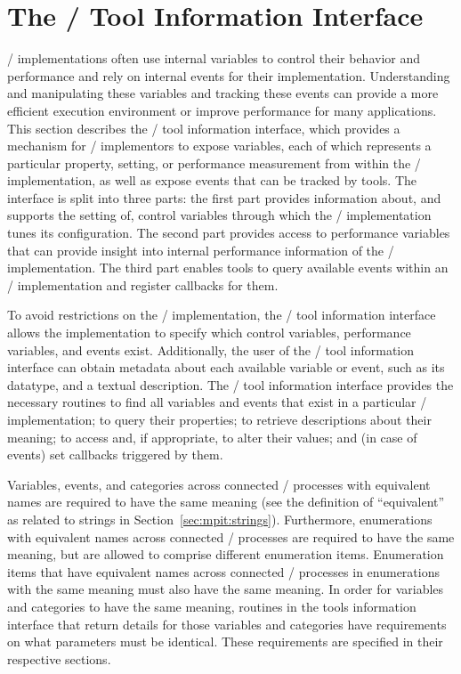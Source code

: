 
\section{The \texorpdfstring{\MPI/}{MPI} Tool Information Interface}
\label{sec:mpit}

\MPI/ implementations often use internal variables to control their
behavior and performance and rely on internal events for their
implementation.  Understanding and manipulating these variables and
tracking these events
can provide a more efficient execution environment or improve performance
for many applications.  This section describes the \MPI/ tool information
interface, which provides a mechanism for \MPI/ implementors to expose
variables, each of which represents a particular property, setting, or
performance measurement from within the \MPI/ implementation, as
well as expose events that can be tracked by tools.  The
interface is split into three parts: the first part provides information
about, and supports the setting of, control variables through which the \MPI/
implementation tunes its configuration.  The second part provides access to
performance variables that can provide insight into internal performance
information of the \MPI/ implementation. The third part enables tools
to query available events within an \MPI/ implementation and
register callbacks for them.

To avoid restrictions on the \MPI/ implementation, the \MPI/ tool
information interface allows the implementation to specify which control variables,
performance variables, and events exist.  Additionally, the user of the \MPI/ tool
information interface can obtain metadata about each available variable or event,
such as its datatype, and a textual description.  The \MPI/ tool
information interface provides the necessary routines to find all variables and events
that exist in a particular \MPI/ implementation; to query their properties;
to retrieve descriptions about their meaning; to access and, if
appropriate, to alter their values; and (in case of events) set callbacks triggered
by them.

Variables, events, and categories across connected \MPI/ processes with equivalent names
are required to have the same meaning (see the definition of ``equivalent''
as related to strings in Section~\ref{sec:mpit:strings}).  Furthermore,
enumerations with equivalent names across connected \MPI/ processes are required
to have the same meaning, but are allowed to comprise different enumeration
items.  Enumeration items that have equivalent names across connected
\MPI/ processes in enumerations with the same meaning must also have the same
meaning.  In order for variables and categories to have the same meaning,
routines in the tools information interface that return details for those
variables and categories have requirements on what parameters must be
identical.  These requirements are specified in their respective sections.

